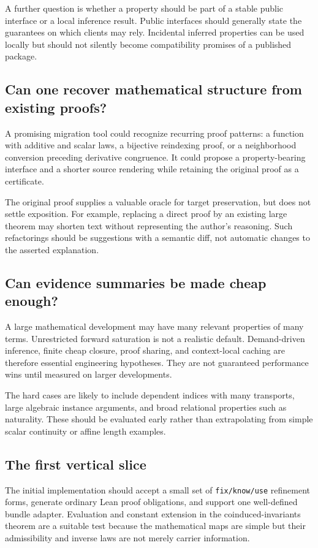 \documentclass[11pt,letterpaper]{article}
\newcommand{\code}[1]{\nolinkurl{#1}}
\theoremstyle{definition}
\theoremstyle{remark}
\begin{document}
A further question is whether a property should be part of a stable public
interface or a local inference result. Public interfaces should generally state
the guarantees on which clients may rely. Incidental inferred properties can be
used locally but should not silently become compatibility promises of a
published package.

\subsection{Can one recover mathematical structure from existing proofs?}
A promising migration tool could recognize recurring proof patterns: a function
with additive and scalar laws, a bijective reindexing proof, or a neighborhood
conversion preceding derivative congruence. It could propose a property-bearing
interface and a shorter source rendering while retaining the original proof as
a certificate.

The original proof supplies a valuable oracle for target preservation, but does
not settle exposition. For example, replacing a direct proof by an existing
large theorem may shorten text without representing the author's reasoning.
Such refactorings should be suggestions with a semantic diff, not automatic
changes to the asserted explanation.

\subsection{Can evidence summaries be made cheap enough?}
A large mathematical development may have many relevant properties of many
terms. Unrestricted forward saturation is not a realistic default. Demand-driven
inference, finite cheap closure, proof sharing, and context-local caching are
therefore essential engineering hypotheses. They are not guaranteed performance
wins until measured on larger developments.

The hard cases are likely to include dependent indices with many transports,
large algebraic instance arguments, and broad relational properties such as
naturality. These should be evaluated early rather than extrapolating from
simple scalar continuity or affine length examples.

\subsection{The first vertical slice}
The initial implementation should accept a small set of \code{fix/know/use}
refinement forms, generate ordinary Lean proof obligations, and support one
well-defined bundle adapter. Evaluation and constant extension in the
coinduced-invariants theorem are a suitable test because the mathematical maps
are simple but their admissibility and inverse laws are not merely carrier
information.
\end{document}
